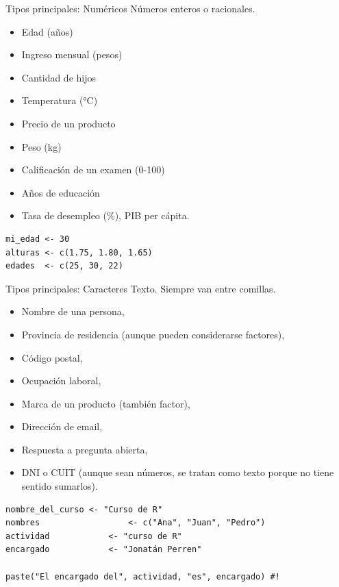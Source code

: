 \documentclass[8pt]{beamer}
\begin{document}
\begin{frame}[fragile]{Tipos principales: Num\'ericos}
	Números enteros o racionales.
	
	\begin{itemize}
		\item Edad (años)
		\item Ingreso mensual (pesos)
		\item Cantidad de hijos
		\item Temperatura (°C)
		\item Precio de un producto
		\item Peso (kg)
		\item Calificación de un examen (0-100)
		\item  Años de educación
		\item Tasa de desempleo (\%), PIB per cápita.
	\end{itemize}
	
\begin{lstlisting}[style=RScript]
mi_edad <- 30
alturas <- c(1.75, 1.80, 1.65)
edades  <- c(25, 30, 22)
\end{lstlisting}
\end{frame}








\begin{frame}[fragile]{Tipos principales: Caracteres}
	Texto. Siempre van entre comillas.
	
	\begin{itemize}
		\item Nombre de una persona, 
		\item Provincia de residencia (aunque pueden considerarse factores), 
		\item Código postal, 
		\item Ocupación laboral, 
		\item Marca de un producto (también factor), 
		\item Dirección de email, 
		\item Respuesta a pregunta abierta, 
		\item DNI o CUIT (aunque sean números, se tratan como texto porque no tiene sentido sumarlos).
	\end{itemize}
	
\begin{lstlisting}[style=RScript]
nombre_del_curso <- "Curso de R"
nombres					 <- c("Ana", "Juan", "Pedro")
actividad 			 <- "curso de R"
encargado 			 <- "Jonatán Perren"

paste("El encargado del", actividad, "es", encargado) #!
\end{lstlisting}
\end{frame}
\end{document}
